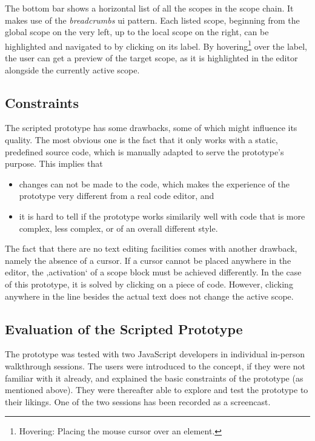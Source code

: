 The bottom bar shows a horizontal list of all the scopes in the scope
chain. It makes use of the \emph{breadcrumbs} \ac{ui} pattern. Each
listed scope, beginning from the global scope on the very left, up to
the local scope on the right, can be highlighted and navigated to by
clicking on its label. By
hovering\footnote{Hovering: Placing the mouse cursor over an element.}
over the label, the user can get a preview of the target scope, as it is
highlighted in the editor alongside the currently active scope.

\subsection{Constraints}\label{constraints}

The scripted prototype has some drawbacks, some of which might influence
its quality. The most obvious one is the fact that it only works with a
static, predefined source code, which is manually adapted to serve the
prototype’s purpose. This implies that

\begin{itemize}
\itemsep1pt\parskip0pt
\item
  changes can not be made to the code, which makes the experience of the
  prototype very different from a real code editor, and
\item
  it is hard to tell if the prototype works similarily well with code
  that is more complex, less complex, or of an overall different style.
\end{itemize}

The fact that there are no text editing facilities comes with another
drawback, namely the absence of a cursor. If a cursor cannot be placed
anywhere in the editor, the ‚activation‘ of a scope block must be
achieved differently. In the case of this prototype, it is solved by
clicking on a piece of code. However, clicking anywhere in the line
besides the actual text does not change the active scope.

\subsection{Evaluation of the Scripted
Prototype}\label{evaluation-of-the-scripted-prototype}

The prototype was tested with two JavaScript developers in individual
in-person walkthrough sessions. The users were introduced to the
concept, if they were not familiar with it already, and explained the
basic constraints of the prototype (as mentioned above). They were
thereafter able to explore and test the prototype to their likings. One
of the two sessions has been recorded as a screencast.

